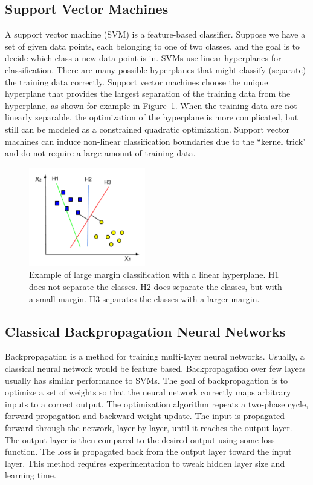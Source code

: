 \subsection{Support Vector Machines}
A support vector machine (SVM) is a feature-based classifier. Suppose we have a set of given data points, each belonging to one of two classes, and the goal is to decide which class a new data point is in. SVMs use linear hyperplanes for classification. There are many possible hyperplanes that might classify (separate) the training data correctly. Support vector machines choose the unique hyperplane that provides the largest separation of the training data from the hyperplane, as shown for example in Figure~\ref{fig:svm}. When the training data are not linearly separable, the optimization of the hyperplane is more complicated, but still can be modeled as a constrained quadratic optimization. Support vector machines can induce non-linear classification boundaries due to the \textquotedblleft kernel trick" and do not require a large amount of training data.

\begin{figure}[t]
  \centering
  \includegraphics[width=2in]{figures/svm.jpg}   
  \caption[Support Vector Machines]{Example of large margin classification with a linear hyperplane. H1 does not separate the classes. H2 does separate the classes, but with a small margin. H3 separates the classes with a larger margin. }
  \label{fig:svm}
\end{figure}


\subsection{Classical Backpropagation Neural Networks}
Backpropagation is a method for training multi-layer neural networks. Usually, a classical neural network would be feature based. Backpropagation over few layers usually has  similar performance to SVMs. The goal of backpropagation is to optimize a set of weights so that the neural network correctly maps arbitrary inputs to a correct output. The optimization algorithm repeats a two-phase cycle, forward propagation and backward weight update. The input is propagated forward through the network, layer by layer, until it reaches the output layer. The output layer is then compared to the desired output using some loss function. The loss is propagated back from the output layer toward the input layer. This method requires  experimentation to tweak hidden layer size and learning time.


